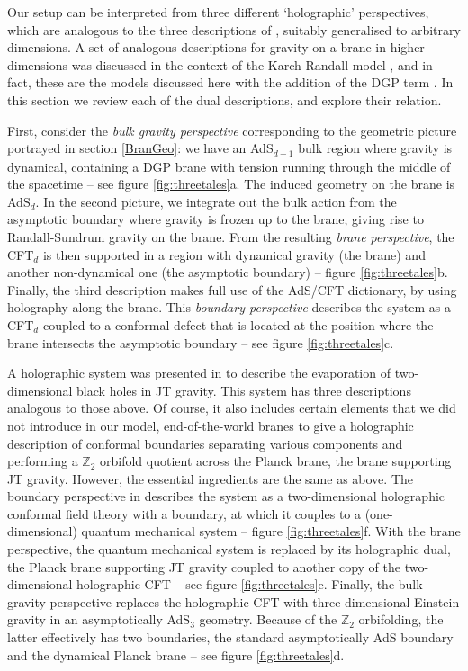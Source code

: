 %

Our setup can be interpreted from three different `holographic' perspectives, which are analogous to the three descriptions of \cite{Almheiri:2019hni}, suitably generalised to arbitrary dimensions. A set of analogous descriptions for gravity on a brane in higher dimensions was discussed in the context of the Karch-Randall model \cite{Karch:2000ct}, and in fact, these are the models discussed here with the addition of the DGP term . In this section we review each of the dual descriptions, and explore their relation. 

First, consider the {\it bulk gravity perspective} corresponding to the geometric picture portrayed in section \ref{BranGeo}: we have an AdS$_{d+1}$ bulk region where gravity is dynamical, containing a DGP brane with tension running through the middle of the spacetime  -- see figure \ref{fig:threetales}a. The induced geometry on the brane is AdS$_d$. In the second picture, we integrate out the bulk action from the asymptotic boundary where gravity is frozen up to the brane, giving rise to Randall-Sundrum gravity \cite{Randall:1999vf,Randall:1999ee,Karch:2000ct} on the brane. From the resulting {\it brane perspective}, the CFT$_d$ is then supported in a region with dynamical gravity (\ie the brane) and another non-dynamical one (\ie the asymptotic boundary) -- figure \ref{fig:threetales}b. Finally, the third description makes full use of the AdS/CFT dictionary, by using holography {along} the brane. This {\it boundary perspective} describes the system as a CFT$_d$ coupled to a conformal defect that is located at the position where the brane intersects the asymptotic boundary -- see figure \ref{fig:threetales}c. 

A holographic system was presented in \cite{Almheiri:2019hni} to describe the evaporation of two-dimensional black holes in JT gravity. This system has three descriptions analogous to those above. Of course, it also includes certain elements that we did not introduce in our model, \ie end-of-the-world branes to give a holographic description of conformal boundaries separating various components  \cite{Takayanagi:2011zk,Fujita:2011fp} and performing a $\mathbb Z_2$ orbifold quotient across the Planck brane, \ie the brane supporting JT gravity. However, the essential ingredients are the same as above. The boundary perspective in \cite{Almheiri:2019hni} describes the system as a two-dimensional holographic conformal field theory with a boundary, at which it couples to a (one-dimensional) quantum mechanical system -- figure \ref{fig:threetales}f. With the brane perspective, the quantum mechanical system is replaced by its holographic dual, the Planck brane supporting JT gravity coupled to another copy of the two-dimensional holographic CFT -- see figure \ref{fig:threetales}e. Finally, the bulk gravity perspective replaces the holographic CFT with three-dimensional Einstein gravity in an asymptotically AdS$_3$ geometry. Because of the $\mathbb Z_2$ orbifolding, the latter effectively has two boundaries, the standard asymptotically AdS boundary and the dynamical Planck brane -- see figure \ref{fig:threetales}d.

